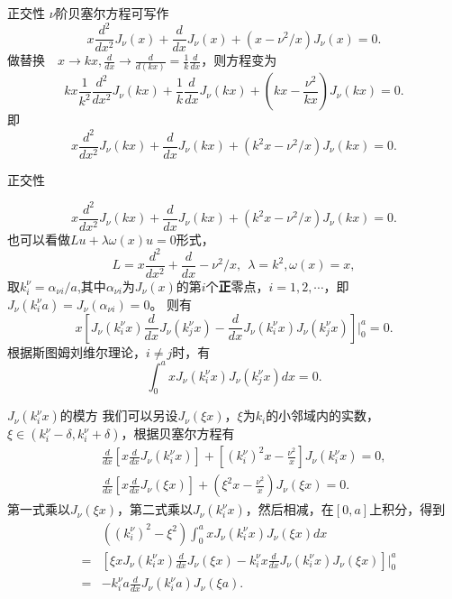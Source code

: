 \documentclass[11pt]{beamer}
\begin{document}
\begin{frame}{正交性}
$\nu$阶贝塞尔方程可写作
\begin{equation}
x \frac{d^2}{dx^2}J_\nu(x) + \frac{d}{dx}J_\nu(x) + (x - \nu^2/x) J_\nu(x) = 0.
\end{equation}
做替换　$x \rightarrow kx, \frac{d}{dx} \rightarrow \frac{d}{d(kx)} = \frac{1}{k}\frac{d}{dx}$，则方程变为
\begin{equation}
kx \frac{1}{k^2}\frac{d^2}{dx^2} J_\nu(kx) + \frac{1}{k}\frac{d}{dx}J_\nu(kx) + (kx - \frac{\nu^2}{kx}) J_\nu(kx) = 0.
\end{equation}
即
\begin{equation}
x \frac{d^2}{dx^2}J_\nu(kx) + \frac{d}{dx}J_\nu(kx) + (k^2x - \nu^2/x) J_\nu(kx) = 0.
\end{equation}
\end{frame}

\begin{frame}{正交性}

\begin{equation}
x \frac{d^2}{dx^2}J_\nu(kx) + \frac{d}{dx}J_\nu(kx) + (k^2x - \nu^2/x) J_\nu(kx) = 0.
\end{equation}
也可以看做$Lu + \lambda \omega(x) u = 0$形式，
\begin{equation}
L = x \frac{d^2}{dx^2} + \frac{d}{dx} - \nu^2/x, ~~ \lambda = k^2, \omega(x) = x,
\end{equation}
取$k^\nu_i = \alpha_{\nu i} / a$,其中$\alpha_{\nu i}$为$J_\nu(x)$的第$i$个{\bf 正}零点，$i=1,2,\cdots$，即 $J_\nu (k^\nu_i a) = J_\nu (\alpha_{\nu i}) = 0$。
则有
\begin{equation}
x [ J_\nu(k^\nu_i x) \frac{d}{dx} J_\nu(k^\nu_j x) - \frac{d}{dx}J_\nu(k^\nu_i x) J_\nu(k^\nu_j x) ]|^a_0 = 0.
\end{equation}
根据斯图姆刘维尔理论，$i \neq j$时，有
\begin{equation}
\int^a_0 x J_\nu(k^\nu_i x) J_\nu(k^\nu_j x) dx = 0. 
\end{equation}
\end{frame}

\begin{frame}{$J_\nu(k^\nu_i x)$的模方}
我们可以另设$J_\nu(\xi x)$，$\xi$为$k_i$的小邻域内的实数，$\xi \in (k^\nu_i - \delta, k^\nu_i + \delta)$，根据贝塞尔方程有
\begin{eqnarray}
&& \frac{d}{dx}[x \frac{d}{dx} J_\nu(k^\nu_i x)] + [(k^\nu_i)^2 x - \frac{\nu^2}{x}] J_\nu(k^\nu_i x) = 0, \\
&& \frac{d}{dx}[x \frac{d}{dx} J_\nu(\xi x)] + (\xi^2 x - \frac{\nu^2}{x}) J_\nu(\xi x) = 0.
\end{eqnarray}
第一式乘以$J_\nu(\xi x)$，第二式乘以$J_\nu(k^\nu_i x)$，然后相减，在$[0,a]$上积分，得到
\begin{eqnarray}
&&((k^\nu_i)^2 - \xi^2) \int^a_0 x J_\nu(k^\nu_i x) J_\nu(\xi x) dx
\nonumber\\
&=& [ \xi x J_\nu(k^\nu_i x) \frac{d}{dx}J_\nu(\xi x) - k^\nu_i x \frac{d}{dx}J_\nu(k^\nu_i x) J_\nu(\xi x) ] |^a_0 
\nonumber\\
&=& - k^\nu_i a \frac{d}{dx}J_\nu( k^\nu_i a ) J_\nu( \xi a).
\end{eqnarray}
\end{frame}
\end{document}
